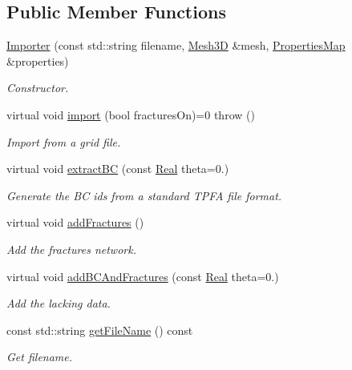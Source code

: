 \subsection*{Public Member Functions}
\begin{DoxyCompactItemize}
\item 
\hyperlink{classFVCode3D_1_1Importer_a8d7a3f864c668155ffd4f29baafb6d05}{Importer} (const std\+::string filename, \hyperlink{classFVCode3D_1_1Mesh3D}{Mesh3D} \&mesh, \hyperlink{classFVCode3D_1_1PropertiesMap}{Properties\+Map} \&properties)
\begin{DoxyCompactList}\small\item\em Constructor. \end{DoxyCompactList}\item 
virtual void \hyperlink{classFVCode3D_1_1Importer_aee8e68c30c3fd4a01f10a5a4365b30ea}{import} (bool fractures\+On)=0  throw ()
\begin{DoxyCompactList}\small\item\em Import from a grid file. \end{DoxyCompactList}\item 
virtual void \hyperlink{classFVCode3D_1_1Importer_a1cba26ff3b2c475a51866361883c59fc}{extract\+BC} (const \hyperlink{namespaceFVCode3D_a40c1f5588a248569d80aa5f867080e83}{Real} theta=0.)
\begin{DoxyCompactList}\small\item\em Generate the BC ids from a standard T\+P\+FA file format. \end{DoxyCompactList}\item 
virtual void \hyperlink{classFVCode3D_1_1Importer_ac3c29fd7bbccef4ae39ce8d0b63b789f}{add\+Fractures} ()
\begin{DoxyCompactList}\small\item\em Add the fractures network. \end{DoxyCompactList}\item 
virtual void \hyperlink{classFVCode3D_1_1Importer_ac21d82671c21b2e4069511ef0585d7f6}{add\+B\+C\+And\+Fractures} (const \hyperlink{namespaceFVCode3D_a40c1f5588a248569d80aa5f867080e83}{Real} theta=0.)
\begin{DoxyCompactList}\small\item\em Add the lacking data. \end{DoxyCompactList}\item 
const std\+::string \hyperlink{classFVCode3D_1_1Importer_a59af1ae8f78282d0e43e6c5c8003402e}{get\+File\+Name} () const 
\begin{DoxyCompactList}\small\item\em Get filename. \end{DoxyCompactList}\item 

\end{DoxyCompactItemize}
